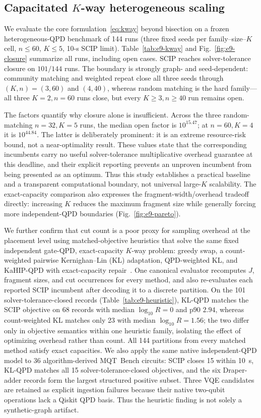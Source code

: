 \documentclass[
  aps,
  pra,
  reprint,
  amsmath,
  amssymb,
  longbibliography,
  nofootinbib,
  floatfix
]{revtex4-2}
\theoremstyle{plain}
\begin{document}
\subsection{Capacitated $K$-way heterogeneous scaling}
\label{sec:results-kway}

We evaluate the core formulation~\eqref{eq:kway} beyond bisection on a frozen heterogeneous-QPD benchmark of 144 runs (three fixed seeds per family--size--$K$ cell, $n\le60$, $K\le5$, 10-s SCIP limit). Table~\ref{tab:e9-kway} and Fig.~\ref{fig:e9-closure} summarize all runs, including open cases. SCIP reaches solver-tolerance closure on $101/144$ runs. The boundary is strongly graph- and seed-dependent: community matching and weighted repeat close all three seeds through $(K,n)=(3,60)$ and $(4,40)$, whereas random matching is the hard family---all three $K=2,n=60$ runs close, but every $K\geq3,n\geq40$ run remains open.

The factors quantify why closure alone is insufficient. Across the three random-matching $n=32,K=5$ runs, the median open factor is $10^{15.47}$; at $n=60,K=4$ it is $10^{44.84}$. The latter is deliberately prominent: it is an extreme resource-risk bound, not a near-optimality result. These values state that the corresponding incumbents carry no useful solver-tolerance multiplicative overhead guarantee at this deadline, and their explicit reporting prevents an unproven incumbent from being presented as an optimum. Thus this study establishes a practical baseline and a transparent computational boundary, not universal large-$K$ scalability. The exact-capacity comparison also expresses the fragment-width/overhead tradeoff directly: increasing $K$ reduces the maximum fragment size while generally forcing more independent-QPD boundaries (Fig.~\ref{fig:e9-pareto}).

We further confirm that cut count is a poor proxy for sampling overhead at the placement level using matched-objective heuristics that solve the same fixed independent gate-QPD, exact-capacity $K$-way problem: greedy swap, a count-weighted pairwise Kernighan--Lin (KL) adaptation, QPD-weighted KL, and KaHIP-QPD with exact-capacity repair~\cite{kernighanlin1970,kahip}. One canonical evaluator recomputes $J$, fragment sizes, and cut occurrences for every method, and also re-evaluates each reported SCIP incumbent after decoding it to a discrete partition. On the 101 solver-tolerance-closed records (Table~\ref{tab:e9-heuristic}), KL-QPD matches the SCIP objective on 68 records with median $\log_{10}R=0$ and p90 $2.94$, whereas count-weighted KL matches only 23 with median $\log_{10}R=1.56$; the two differ only in objective semantics within one heuristic family, isolating the effect of optimizing overhead rather than count. All 144 partitions from every matched method satisfy exact capacities. We also apply the same native independent-QPD model to 36 algorithm-derived MQT~Bench circuits: SCIP closes 15 within 10~s, KL-QPD matches all 15 solver-tolerance-closed objectives, and the six Draper-adder records form the largest structured positive subset. Three VQE candidates are retained as explicit ingestion failures because their native two-qubit operations lack a Qiskit QPD basis. Thus the heuristic finding is not solely a synthetic-graph artifact.
\end{document}
